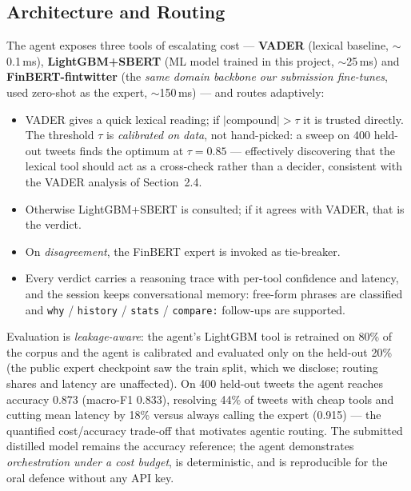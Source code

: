 \documentclass[11pt,a4paper]{article}
\newcommand{\tH}[1]{\textcolor{maincolor}{\textbf{#1}}}
\begin{document}
\subsection{Architecture and Routing}
The agent exposes three tools of escalating cost --- \tH{VADER} (lexical baseline,
$\sim$0.1\,ms), \tH{LightGBM+SBERT} (ML model trained in this project, $\sim$25\,ms) and
\tH{FinBERT-fintwitter} (the \emph{same domain backbone our submission fine-tunes}, used
zero-shot as the expert, $\sim$150\,ms) --- and routes adaptively:
\begin{itemize}
  \item VADER gives a quick lexical reading; if $|\text{compound}| > \tau$ it is trusted directly.
  The threshold $\tau$ is \emph{calibrated on data}, not hand-picked: a sweep on 400 held-out
  tweets finds the optimum at $\tau{=}0.85$ --- effectively discovering that the lexical tool
  should act as a cross-check rather than a decider, consistent with the VADER analysis of
  Section~2.4.
  \item Otherwise LightGBM+SBERT is consulted; if it agrees with VADER, that is the verdict.
  \item On \emph{disagreement}, the FinBERT expert is invoked as tie-breaker.
  \item Every verdict carries a reasoning trace with per-tool confidence and latency, and the
  session keeps conversational memory: free-form phrases are classified and \texttt{why} /
  \texttt{history} / \texttt{stats} / \texttt{compare:} follow-ups are supported.
\end{itemize}
Evaluation is \emph{leakage-aware}: the agent's LightGBM tool is retrained on 80\% of the corpus
and the agent is calibrated and evaluated only on the held-out 20\% (the public expert checkpoint
saw the train split, which we disclose; routing shares and latency are unaffected). On 400
held-out tweets the agent reaches accuracy 0.873 (macro-F1 0.833), resolving 44\% of tweets with
cheap tools and cutting mean latency by 18\% versus always calling the expert (0.915) --- the
quantified cost/accuracy trade-off that motivates agentic routing. The submitted distilled model
remains the accuracy reference; the agent demonstrates \emph{orchestration under a cost budget},
is deterministic, and is reproducible for the oral defence without any API key.

\end{document}
